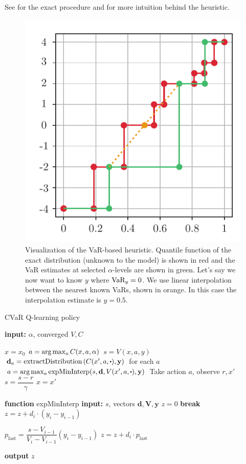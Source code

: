 See  for the exact procedure and  for more intuition behind the heuristic.

\begin{figure}[h]
\center
\includegraphics[width=0.5\linewidth]{gfx/heuristic.pdf}
\caption[The VaR-based heuristic.]{Visualization of the VaR-based heuristic. Quantile function of the exact distribution (unknown to the model) is shown in red and the VaR estimates at selected $\alpha$-levels are shown in green. Let's say we now want to know $y$ where $\text{VaR}_y = 0$. We use linear interpolation between the nearest known VaRs, shown in orange. In this case the interpolation estimate is $y=0.5$.}
\label{fig:heuristic}
\end{figure}


\begin{algorithm}[!p]
\caption{CVaR Q-learning policy}\label{alg:varbasedpolicy}
\begin{algorithmic}
    \STATE \textbf{input:} $\alpha$, converged $V, C$
    		
	\STATE $x = x_0$
	\STATE $a = \text{arg}\max_a C(x, a, \alpha)$
	\STATE $s = V(x, a, y)$
	\STATE $\mathbf{d}_a = \text{extractDistribution}\bround{C(x', a, \bigcdot), \mathbf{y}}$ for each $a$
	\STATE $a = \argmax_a \text{expMinInterp}(s, \mathbf{d}, V(x', a, \bigcdot), \mathbf{y})$
	\STATE Take action $a$, observe $r, x'$
	\STATE $s = \dfrac{s-r}{\gamma}$
	\STATE $x = x'$
	\ENDWHILE

\hrulefill

	\STATE {}
	\STATE \textbf{function} expMinInterp  
\bindent
    \STATE \textbf{input:} $s$, vectors $\mathbf{d}, \mathbf{V}, \mathbf{y}$
    \STATE $z = 0$
		\STATE \textbf{break}
		\ENDIF
		\STATE $z = z + d_i\cdot(y_i - y_{i-1})$
	\ENDFOR
	
	\STATE $p_{\text{last}} = \dfrac{s - V_{i-1}}{V_{i}-V_{i-1}}(y_i - y_{i-1})$
	\STATE $z = z + d_i \cdot p_{\text{last}}$
	
	\STATE \textbf{output} $z$
\eindent
\end{algorithmic}
\end{algorithm}

